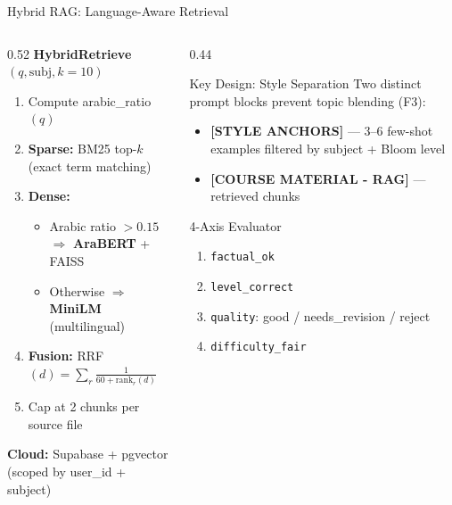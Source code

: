 \documentclass[aspectratio=169]{beamer}
\begin{document}
\begin{frame}{Hybrid RAG: Language-Aware Retrieval}
  \begin{columns}[T]
    \begin{column}{0.52\textwidth}
      \textbf{HybridRetrieve$(q, \text{subj}, k{=}10)$}
      \begin{enumerate}
        \item Compute arabic\_ratio$(q)$
        \item \textbf{Sparse:} BM25 top-$k$ (exact term matching)
        \item \textbf{Dense:}
          \begin{itemize}
            \item Arabic ratio $> 0.15$ $\Rightarrow$ \textbf{AraBERT} + FAISS
            \item Otherwise $\Rightarrow$ \textbf{MiniLM} (multilingual)
          \end{itemize}
        \item \textbf{Fusion:} RRF$(d) = \sum_r \frac{1}{60 + \text{rank}_r(d)}$
        \item Cap at 2 chunks per source file
      \end{enumerate}

      \vspace{6pt}
      \textbf{Cloud:} Supabase + pgvector\\
      (scoped by user\_id + subject)
    \end{column}
    \begin{column}{0.44\textwidth}
      \begin{block}{Key Design: Style Separation}
        Two distinct prompt blocks prevent topic blending (F3):
        \begin{itemize}
          \item \textbf{[STYLE ANCHORS]} — 3--6 few-shot examples
                filtered by subject + Bloom level
          \item \textbf{[COURSE MATERIAL - RAG]} — retrieved chunks
        \end{itemize}
      \end{block}

      \vspace{6pt}
      \begin{block}{4-Axis Evaluator}
        \begin{enumerate}
          \item \texttt{factual\_ok}
          \item \texttt{level\_correct}
          \item \texttt{quality}: good / needs\_revision / reject
          \item \texttt{difficulty\_fair}
        \end{enumerate}
      \end{block}
    \end{column}
  \end{columns}
\end{frame}
\end{document}
